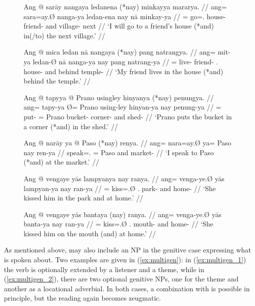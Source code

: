 \begin{figure}
\pex\label{ex:multiplace}
\a\label{ex:multiplace_1}\begingl
	\gla Ang @ sarāy nangaya ledanena (*nay) minkayya mararya. //
	\glb ang= sara=ay.Ø nanga-ya ledan-ena nay nā minkay-ya //
	\glc \AgtT{}= go=\Fsg{}.\Top{} house-\Loc{} friend-\Gen{} and
		village-\Loc{} next //
	\glft `I will go to a friend's house (*and) in(/to) the next village.' //
\endgl

\a\label{ex:multiplace_2}\begingl
	\gla Ang @ mica ledan nā nangaya (*nay) pang natrangya. //
	\glb ang= mit-ya ledan-Ø nā nanga-ya nay pang natrang-ya //
	\glc \AgtT{}= live-\TsgM{} friend-\Top{} \Fsg{}.\Gen{} house-\Loc{} and
		behind temple-\Loc{} //
	\glft `My friend lives in the house (*and) behind the temple.' //
\endgl

\a\label{ex:multiplace_3}\begingl
	\gla Ang @ tapyya {} @ Prano usingley hinyanya (*nay) penungya. //
	\glb ang= tapy-ya Ø= Prano using-ley hinyan-ya nay penung-ya //
	\glc \AgtT{}= put-\TsgM{} \Top{}= Prano bucket-\PargI{} corner-\Loc{}
		and shed-\Loc {} //
	\glft `Prano puts the bucket in a corner (*and) in the shed.' //
\endgl

\a\label{ex:multiplace_4}\begingl
	\gla Ang @ narāy ya @ Paso (*nay) renya. //
	\glb ang= nara=ay.Ø ya= Paso nay ren-ya //
	\glc \AgtT{} speak=\Fsg{}.\Top{} \Loc{}= Paso and market-\Loc{} //
	\glft `I speak to Paso (*and) at the market.' //
\endgl
\xe
\end{figure}

\begin{figure}[h]
\pex\label{ex:multiplace_5}%
\a\label{ex:multiplace_5_1}%
\begingl
	\gla Ang @ vengaye yās lampyanya nay ranya. //
	\glb ang= venga-ye.Ø yās lampyan-ya nay ran-ya //
	\glc \AgtT{}= kiss=\TsgF{}.Ø \TsgM{}.\Parg{} park-\Loc{} and home-\Loc{} //
	\glft `She kissed him in the park and at home.' //
\endgl

\a\label{ex:multiplace_5_2}%
\begingl
	\gla Ang @ vengaye yās bantaya (\excl{}nay) ranya. //
	\glb ang= venga-ye.Ø yās banta-ya nay ran-ya //
	\glc \AgtT{}= kiss=\TsgF{}.Ø \TsgM{}.\Parg{} mouth-\Loc{} and 
		home-\Loc{}	//
	\glft `She kissed him on the mouth (\excl{}and) at home.' //
\endgl
\xe
\end{figure}

As mentioned above,  may also include an NP in the genitive
case expressing what is spoken about. Two examples are given in
(\ref{ex:multigen}): in (\ref{ex:multigen_1}) the verb is optionally extended
by a listener and a theme, while in (\ref{ex:multigen_2}), there are two
optional genitive NPs, one for the theme and another as a locational adverbial.
In both cases, a combination with  is possible in principle,
but the reading again becomes zeugmatic.

